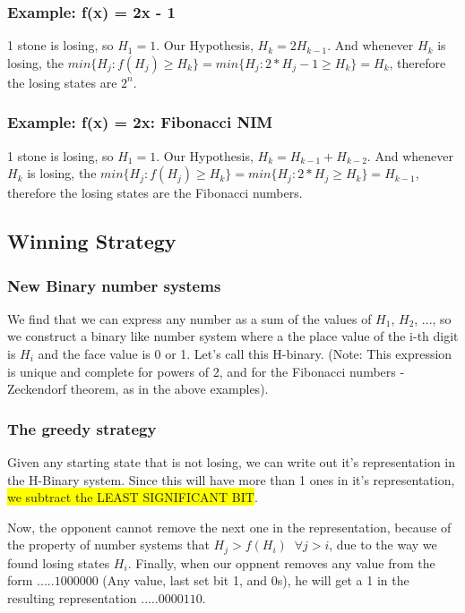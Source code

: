 \subsubsection{Example: f(x) = 2x - 1}
1 stone is losing, so $H_1 = 1$. Our Hypothesis, $H_k = 2 H_{k-1}$. And whenever $H_k$ is losing, the $min\{H_j : f(H_j) \geq H_k\} = min\{H_j : 2*H_j-1 \geq H_k\} = H_k$, therefore the losing states are $2^n$.
\subsubsection{Example: f(x) = 2x: Fibonacci NIM}
1 stone is losing, so $H_1 = 1$. Our Hypothesis, $H_k = H_{k-1} + H_{k-2}$. And whenever $H_k$ is losing, the $min\{H_j : f(H_j) \geq H_k\} = min\{H_j : 2*H_j \geq H_k\} = H_{k-1}$, therefore the losing states are the Fibonacci numbers.


\subsection{Winning Strategy}

\subsubsection{New Binary number systems}
We find that we can express any number as a sum of the values of $H_1$, $H_2$, ..., so we construct a binary like number system where a the place value of the i-th digit is $H_i$ and the face value is 0 or 1. Let's call this H-binary. (Note: This expression is unique and complete for powers of 2, and for the Fibonacci numbers - Zeckendorf theorem, as in the above examples).

\subsubsection{The greedy strategy}

Given any starting state that is not losing, we can write out it's representation in the H-Binary system.
Since this will have more than 1 ones in it's representation, \colorbox{yellow}{we subtract the LEAST SIGNIFICANT BIT}.

Now, the opponent cannot remove the next one in the representation, because of the property of number systems that $H_j > f(H_i) \;\; \forall j > i$, due to the way we found losing states $H_i$. Finally, when our oppnent removes any value from the form $.....1000000$ (Any value, last set bit 1, and 0s), he will get a 1 in the resulting representation $.....0000110$.

